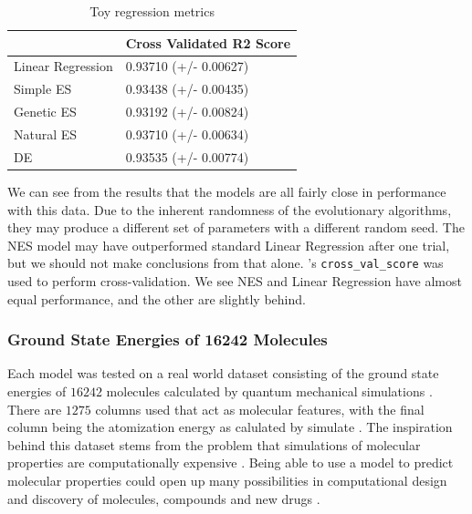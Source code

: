 \documentclass[conference]{IEEEtran}
\begin{document}
\begin{table}[htbp]
\centering
\begin{tabular}{@{}ll@{}}
\toprule
 & Cross Validated R2 Score \\ \midrule
Linear Regression & 0.93710 (+/- 0.00627) \\
Simple ES & 0.93438 (+/- 0.00435) \\
Genetic ES & 0.93192 (+/- 0.00824) \\
Natural ES & 0.93710 (+/- 0.00634) \\
DE & 0.93535 (+/- 0.00774) \\ \bottomrule
\end{tabular}
\caption{Toy regression metrics}
\label{tab:toy-regr2}
\end{table}

We can see from the results that the models are all fairly close in performance with this data. Due to the inherent randomness of the evolutionary 
algorithms, they may produce a different set of parameters with a different random seed. The NES model may have outperformed standard Linear 
Regression after one trial, but we should not make conclusions from that alone. \cite{scikit}'s \texttt{cross\_val\_score} was used to perform 
cross-validation. We see NES and Linear Regression have almost equal performance, and the other are slightly behind.

\subsubsection{Ground State Energies of 16242 Molecules}
Each model was tested on a real world dataset consisting of the ground state energies of $16242$ molecules calculated by quantum mechanical 
simulations \cite{molecules}. There are $1275$ columns used that act as molecular features, with the final column being the atomization energy as 
calulated by simulate \cite{molecules}. The inspiration behind this dataset stems from the problem that simulations of molecular properties are 
computationally expensive \cite{molecules}. Being able to use a model to predict molecular properties could open up many possibilities in 
computational design and discovery of molecules, compounds and new drugs \cite{molecules}.
\end{document}
